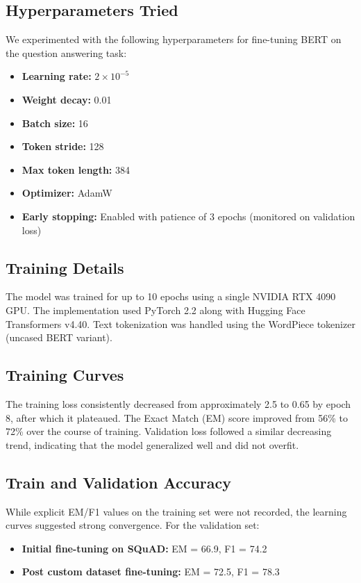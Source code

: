 \documentclass[10pt,conference]{IEEEtran}
\begin{document}
\subsection{Hyperparameters Tried}
We experimented with the following hyperparameters for fine-tuning BERT on the question answering task:
\begin{itemize}
    \item \textbf{Learning rate:} $2 \times 10^{-5}$
    \item \textbf{Weight decay:} 0.01
    \item \textbf{Batch size:} 16
    \item \textbf{Token stride:} 128
    \item \textbf{Max token length:} 384
    \item \textbf{Optimizer:} AdamW
    \item \textbf{Early stopping:} Enabled with patience of 3 epochs (monitored on validation loss)
\end{itemize}

\subsection{Training Details}
The model was trained for up to 10 epochs using a single NVIDIA RTX 4090 GPU. The implementation used PyTorch 2.2 along with Hugging Face Transformers v4.40. Text tokenization was handled using the WordPiece tokenizer (uncased BERT variant).

\subsection{Training Curves}
The training loss consistently decreased from approximately 2.5 to 0.65 by epoch 8, after which it plateaued. The Exact Match (EM) score improved from 56\% to 72\% over the course of training. Validation loss followed a similar decreasing trend, indicating that the model generalized well and did not overfit.

\subsection{Train and Validation Accuracy}
While explicit EM/F1 values on the training set were not recorded, the learning curves suggested strong convergence. For the validation set:
\begin{itemize}
    \item \textbf{Initial fine-tuning on SQuAD:} EM = 66.9, F1 = 74.2
    \item \textbf{Post custom dataset fine-tuning:} EM = 72.5, F1 = 78.3
\end{itemize}
\end{document}
